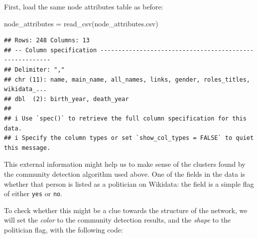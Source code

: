 \documentclass[
]{book}
\newenvironment{Shaded}{\begin{snugshade}}{\end{snugshade}}
\newcommand{\FunctionTok}[1]{\textcolor[rgb]{0.00,0.00,0.00}{#1}}
\newcommand{\NormalTok}[1]{#1}
\newcommand{\OtherTok}[1]{\textcolor[rgb]{0.56,0.35,0.01}{#1}}
\newcommand{\StringTok}[1]{\textcolor[rgb]{0.31,0.60,0.02}{#1}}
\begin{document}
First, load the same node attributes table as before:

\begin{Shaded}
\begin{Highlighting}[]
\NormalTok{node\_attributes }\OtherTok{=} \FunctionTok{read\_csv}\NormalTok{(}\StringTok{\textquotesingle{}node\_attributes.csv\textquotesingle{}}\NormalTok{)}
\end{Highlighting}
\end{Shaded}

\begin{verbatim}
## Rows: 248 Columns: 13
## -- Column specification --------------------------------------------------------
## Delimiter: ","
## chr (11): name, main_name, all_names, links, gender, roles_titles, wikidata_...
## dbl  (2): birth_year, death_year
## 
## i Use `spec()` to retrieve the full column specification for this data.
## i Specify the column types or set `show_col_types = FALSE` to quiet this message.
\end{verbatim}

This external information might help us to make sense of the clusters found by the community detection algorithm used above. One of the fields in the data is whether that person is listed as a politician on Wikidata: the field is a simple flag of either \texttt{yes} or \texttt{no}.

To check whether this might be a clue towards the structure of the network, we will set the \emph{color} to the community detection results, and the \emph{shape} to the politician flag, with the following code:
\end{document}
